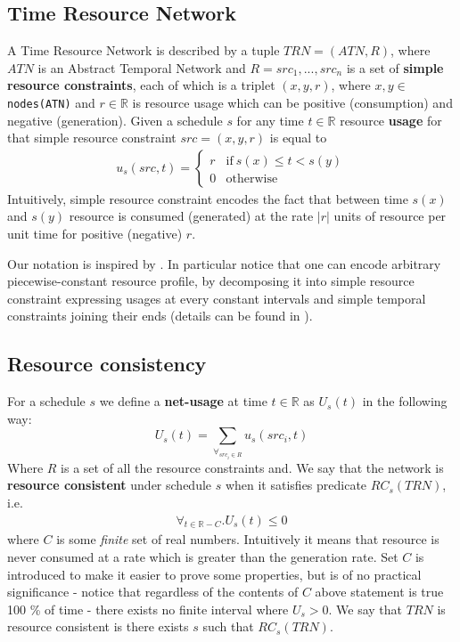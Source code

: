 \documentclass{article}
\begin{document}
\begin{multicols}{2}
\subsection{Time Resource Network}
\label{sec:trn_definition}
A Time Resource Network is described by a tuple $TRN = (ATN, R)$, where $ATN$ is an Abstract Temporal Network and $R={src_1, ..., src_n}$ is a set of \textbf{simple resource constraints}, each of which is a triplet $(x, y, r)$, where $x, y \in$ \texttt{nodes(ATN)} and $r \in \mathbb{R}$ is resource usage which can be positive (consumption) and negative (generation). Given a schedule $s$ for any time $t \in \mathbb{R}$ resource \textbf{usage} for that simple resource constraint $src=(x,y,r)$ is equal to
\begin{align*}
u_s(src, t) = \begin{cases}
r & \text{if}\ s(x) \leq t < s(y)\\
0 & \text{otherwise}
\end{cases}
\end{align*}
Intuitively, simple resource constraint encodes the fact that between time $s(x)$ and $s(y)$  resource is consumed (generated) at the rate $|r|$ units of resource per unit time for positive (negative) $r$.

Our notation is inspired by \cite{bartusch1988scheduling}. In particular notice that one can encode arbitrary piecewise-constant resource profile, by decomposing it into simple resource constraint expressing usages at every constant intervals and simple temporal constraints joining their ends (details can be found in \cite{bartusch1988scheduling}).


\subsection{Resource consistency}
For a schedule $s$ we define a \textbf{net-usage} at time $t \in \mathbb{R}$ as $U_s(t)$ in the following way:
\[
U_s(t) = \sum_{\forall_{src_i \in R}} u_s(src_i, t)
\]
Where $R$ is a set of all the resource constraints and. We say that the network is \textbf{resource consistent} under schedule $s$ when it satisfies predicate $RC_s(TRN)$, i.e.
\begin{align}
\label{usage_for_all}\forall_{t \in {\mathbb{R} - C}} . U_s(t) \leq 0
\end{align}
where $C$ is some \textit{finite} set of real numbers. Intuitively it means that resource is never consumed at a rate which is greater than the generation rate. Set $C$ is introduced to make it easier to prove some properties, but is of no practical significance - notice that regardless of the contents of $C$ above statement is true 100 \% of time - there exists no finite interval where $U_s > 0$. We say that $TRN$ is resource consistent is there exists $s$ such that $RC_s(TRN)$.

\end{multicols}
\end{document}
